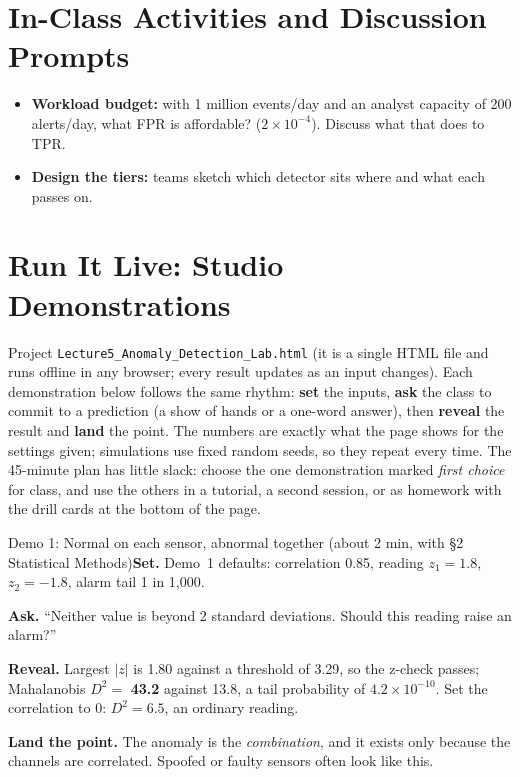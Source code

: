 \documentclass[11pt]{article}
\begin{document}
\section{In-Class Activities and Discussion Prompts}\label{sec:act}\begin{itemize}\item \textbf{Workload budget:} with 1 million events/day and an analyst capacity of 200 alerts/day, what FPR is affordable? ($2\times10^{-4}$). Discuss what that does to TPR.\item \textbf{Design the tiers:} teams sketch which detector sits where and what each passes on.\end{itemize}

\section{Run It Live: Studio Demonstrations}\label{sec:live}

Project \texttt{Lecture5\_Anomaly\_Detection\_Lab.html} (it is a single HTML file and runs offline in any browser; every result updates as an input changes). Each demonstration below follows the same rhythm: \textbf{set} the inputs, \textbf{ask} the class to commit to a prediction (a show of hands or a one-word answer), then \textbf{reveal} the result and \textbf{land} the point. The numbers are exactly what the page shows for the settings given; simulations use fixed random seeds, so they repeat every time. The 45-minute plan has little slack: choose the one demonstration marked \emph{first choice} for class, and use the others in a tutorial, a second session, or as homework with the drill cards at the bottom of the page.

\begin{live}{Demo 1: Normal on each sensor, abnormal together (about 2 min, with \S2 Statistical Methods)}\textbf{Set.} Demo~1 defaults: correlation 0.85, reading $z_1=1.8$, $z_2=-1.8$, alarm tail 1 in 1,000.\par\smallskip\textbf{Ask.} ``Neither value is beyond 2 standard deviations. Should this reading raise an alarm?''\par\smallskip\textbf{Reveal.} Largest $|z|$ is 1.80 against a threshold of 3.29, so the z-check passes; Mahalanobis $D^2=$ \textbf{43.2} against 13.8, a tail probability of $4.2\times10^{-10}$. Set the correlation to 0: $D^2=6.5$, an ordinary reading.\par\smallskip\textbf{Land the point.} The anomaly is the \emph{combination}, and it exists only because the channels are correlated. Spoofed or faulty sensors often look like this.\end{live}
\end{document}
